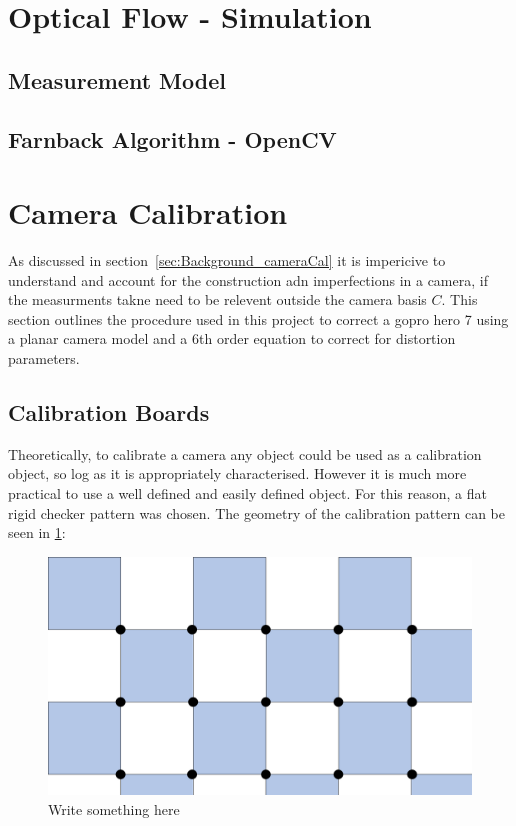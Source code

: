 \documentclass{UoNMCHA}
\numberwithin{equation}{section}
\begin{document}
\section{Optical Flow - Simulation}
\subsection{Measurement Model}
\subsection{Farnback Algorithm - OpenCV}

\newpage
\section{Camera Calibration}
As discussed in section~\ref{sec:Background_cameraCal} it is impericive to understand and account for the construction adn imperfections in a camera, if the measurments takne need to be relevent outside the camera basis $C$. This section outlines the procedure used in this project to correct a gopro hero 7 using a planar camera model and a 6th order equation to correct for distortion parameters.
\subsection{Calibration Boards}
Theoretically, to calibrate a camera any object could be used as a calibration object, so log as it is appropriately characterised. However it is much more practical to use a well defined and easily defined object. For this reason, a flat rigid checker pattern was chosen. The geometry of the calibration pattern can be seen in \ref{fig:cornerLocations}:

\begin{figure}[ht]
    \begin{center}
        \includegraphics[width=.6\linewidth]{Figures/CalibCornerLocations}
        \caption{Write something here}
        \label{fig:cornerLocations}
    \end{center}
\end{figure}
\end{document}
